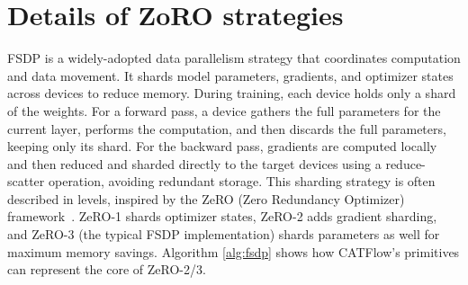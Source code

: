 \documentclass[letterpaper,twocolumn,10pt]{article}
\newcommand{\name}{CATFlow}
\begin{document}
\section{Details of ZoRO strategies}

FSDP is a widely-adopted data parallelism strategy that coordinates computation and data movement. It shards model parameters, gradients, and optimizer states across devices to reduce memory. During training, each device holds only a shard of the weights. For a forward pass, a device gathers the full parameters for the current layer, performs the computation, and then discards the full parameters, keeping only its shard. For the backward pass, gradients are computed locally and then reduced and sharded directly to the target devices using a reduce-scatter operation, avoiding redundant storage. This sharding strategy is often described in levels, inspired by the ZeRO (Zero Redundancy Optimizer) framework~\cite{rajbhandari2020zero}. ZeRO-1 shards optimizer states, ZeRO-2 adds gradient sharding, and ZeRO-3 (the typical FSDP implementation) shards parameters as well for maximum memory savings. Algorithm \ref{alg:fsdp} shows how \name{}'s primitives can represent the core of ZeRO-2/3. 
\end{document}

